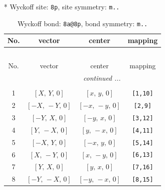 \documentclass[fleqn,8pt]{jsarticle}
\begin{document}
* Wyckoff site: {\tt 8p}, site symmetry: {\tt m..}
\renewcommand{\arraystretch}{1.2}
\begin{longtable}{cccc}
\caption{Wyckoff bond: {\tt 8a@8p}, bond symmetry: {\tt m..}}
 \\
 \hline \hline
No. & vector & center & mapping \\ \hline \endfirsthead

\multicolumn{3}{l}{\tablename\ \thetable{}} \\
 \hline \hline
No. & vector & center & mapping \\ \hline \endhead

 \hline \hline
\multicolumn{3}{r}{\footnotesize\it continued ...} \\ \endfoot

 \hline \hline
\multicolumn{3}{r}{} \\ \endlastfoot

1 & $\left[ X,\, Y,\, 0 \right]$ & $\left[ x,\, y,\, 0 \right]$ & {\tt [1,10]} \\ \hline
2 & $\left[ - X,\, - Y,\, 0 \right]$ & $\left[ - x,\, - y,\, 0 \right]$ & {\tt [2,9]} \\ \hline
3 & $\left[ - Y,\, X,\, 0 \right]$ & $\left[ - y,\, x,\, 0 \right]$ & {\tt [3,12]} \\ \hline
4 & $\left[ Y,\, - X,\, 0 \right]$ & $\left[ y,\, - x,\, 0 \right]$ & {\tt [4,11]} \\ \hline
5 & $\left[ - X,\, Y,\, 0 \right]$ & $\left[ - x,\, y,\, 0 \right]$ & {\tt [5,14]} \\ \hline
6 & $\left[ X,\, - Y,\, 0 \right]$ & $\left[ x,\, - y,\, 0 \right]$ & {\tt [6,13]} \\ \hline
7 & $\left[ Y,\, X,\, 0 \right]$ & $\left[ y,\, x,\, 0 \right]$ & {\tt [7,16]} \\ \hline
8 & $\left[ - Y,\, - X,\, 0 \right]$ & $\left[ - y,\, - x,\, 0 \right]$ & {\tt [8,15]} \\
\end{longtable}
\renewcommand{\arraystretch}{1.2}
\end{document}
